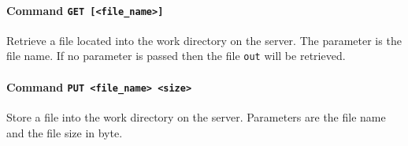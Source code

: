 \documentclass[12pt,titlepage]{article}
\newcommand{\mcs}{\textbf{MCS} }
\begin{document}
%
%
%
%
%
%
%
%
%
%

%
\paragraph{Command \texttt{GET [<file\_name>]}}
Retrieve a file located into the work directory on the server. The
parameter is the file name. If no parameter is passed then the file
\verb|out| will be retrieved.

\paragraph{Command \texttt{PUT <file\_name> <size>}}
Store a file into the work directory on the server. Parameters are the
file name and the file size in byte.
\end{document}
